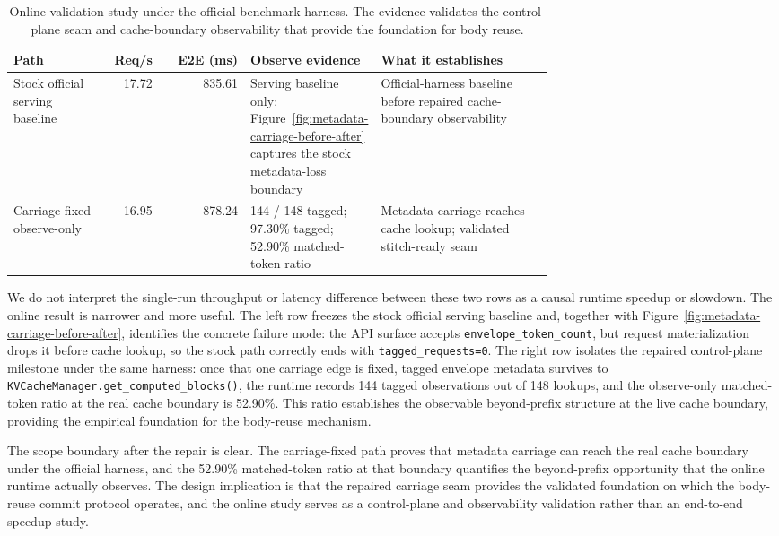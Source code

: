 \documentclass[conference]{IEEEtran}
\begin{document}
\begin{table}[t]
\caption{Online validation study under the official benchmark harness. The evidence validates the control-plane seam and cache-boundary observability that provide the foundation for body reuse.}
\label{tab:online-validation}
\centering
\footnotesize
\setlength{\tabcolsep}{3pt}
\begin{tabular}{@{}P{0.17\linewidth}rrP{0.21\linewidth}P{0.32\linewidth}@{}}
\toprule
Path & Req/s & E2E (ms) & Observe evidence & What it establishes \\
\midrule
Stock official serving baseline & 17.72 & 835.61 & Serving baseline only; Figure~\ref{fig:metadata-carriage-before-after} captures the stock metadata-loss boundary & Official-harness baseline before repaired cache-boundary observability \\
Carriage-fixed observe-only & 16.95 & 878.24 & 144 / 148 tagged; 97.30\% tagged; 52.90\% matched-token ratio & Metadata carriage reaches cache lookup; validated stitch-ready seam \\
\bottomrule
\end{tabular}
\end{table}

We do not interpret the single-run throughput or latency difference between these two rows as a causal runtime speedup or slowdown. The online result is narrower and more useful. The left row freezes the stock official serving baseline and, together with Figure~\ref{fig:metadata-carriage-before-after}, identifies the concrete failure mode: the API surface accepts \texttt{envelope\_token\_count}, but request materialization drops it before cache lookup, so the stock path correctly ends with \texttt{tagged\_requests=0}. The right row isolates the repaired control-plane milestone under the same harness: once that one carriage edge is fixed, tagged envelope metadata survives to \texttt{KVCacheManager.get\_computed\_blocks()}, the runtime records 144 tagged observations out of 148 lookups, and the observe-only matched-token ratio at the real cache boundary is 52.90\%. This ratio establishes the observable beyond-prefix structure at the live cache boundary, providing the empirical foundation for the body-reuse mechanism.

The scope boundary after the repair is clear. The carriage-fixed path proves that metadata carriage can reach the real cache boundary under the official harness, and the 52.90\% matched-token ratio at that boundary quantifies the beyond-prefix opportunity that the online runtime actually observes. The design implication is that the repaired carriage seam provides the validated foundation on which the body-reuse commit protocol operates, and the online study serves as a control-plane and observability validation rather than an end-to-end speedup study.
\end{document}
